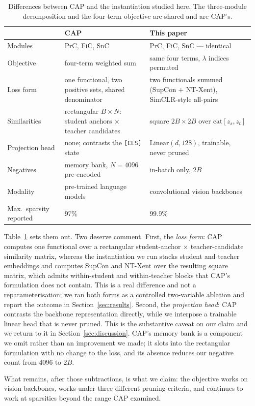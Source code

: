 \begin{table}[t]
\centering
\small
\caption{Differences between CAP \citep{xu2022cap} and the instantiation studied
here. The three-module decomposition and the four-term objective are shared and
are CAP's.}
\label{tab:cap-diff}
\begin{tabular}{@{}p{}p{}p{}@{}}
\toprule
 & CAP \citep{xu2022cap} & This paper \\
\midrule
Modules & PrC, FiC, SnC & PrC, FiC, SnC --- identical \\
Objective & four-term weighted sum & same four terms, $\lambda$ indices permuted \\
Loss form & one functional, two positive sets, shared denominator & two functionals summed (SupCon $+$ NT-Xent), SimCLR-style all-pairs \\
Similarities & rectangular $B \times N$: student anchors $\times$ teacher candidates & square $2B \times 2B$ over $\mathrm{cat}[z_s, z_t]$ \\
Projection head & none; contrasts the \texttt{[CLS]} state & $\mathrm{Linear}(d,128)$, trainable, never pruned \\
Negatives & memory bank, $N = 4096$ pre-encoded & in-batch only, $2B$ \\
Modality & pre-trained language models & convolutional vision backbones \\
Max.\ sparsity reported & 97\% & 99.9\% \\
\bottomrule
\end{tabular}
\end{table}

Table~\ref{tab:cap-diff} sets them out. Two deserve comment. First, the
\emph{loss form}: CAP computes one functional over a rectangular
student-anchor $\times$ teacher-candidate similarity matrix, whereas the
instantiation we run stacks student and teacher embeddings and computes SupCon
and NT-Xent over the resulting square matrix, which admits within-student and
within-teacher blocks that CAP's formulation does not contain. This is a real
difference and not a reparameterisation; we ran both forms as a controlled
two-variable ablation and report the outcome in Section~\ref{sec:results}.
Second, the \emph{projection head}: CAP contrasts the backbone representation
directly, while we interpose a trainable linear head that is never pruned. This
is the substantive caveat on our claim and we return to it in
Section~\ref{sec:discussion}. CAP's memory bank is a component we omit rather
than an improvement we made; it slots into the rectangular formulation with no
change to the loss, and its absence reduces our negative count from $4096$ to
$2B$.

What remains, after those subtractions, is what we claim: the objective works on
vision backbones, works under three different pruning criteria, and continues to
work at sparsities beyond the range CAP examined.
